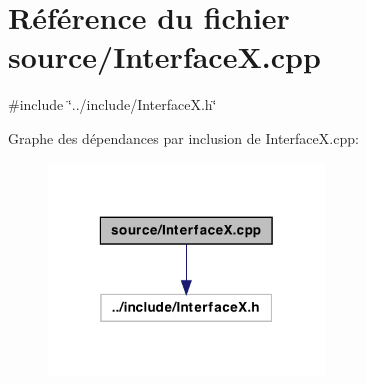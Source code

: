 \hypertarget{a00005}{
\section{Référence du fichier source/InterfaceX.cpp}
\label{a00005}
}
{\ttfamily \#include \char`\"{}../include/InterfaceX.h\char`\"{}}\par
Graphe des dépendances par inclusion de InterfaceX.cpp:
\nopagebreak
\begin{figure}[H]
\begin{center}
\leavevmode
\includegraphics[width=208pt]{a00012}
\end{center}
\end{figure}
